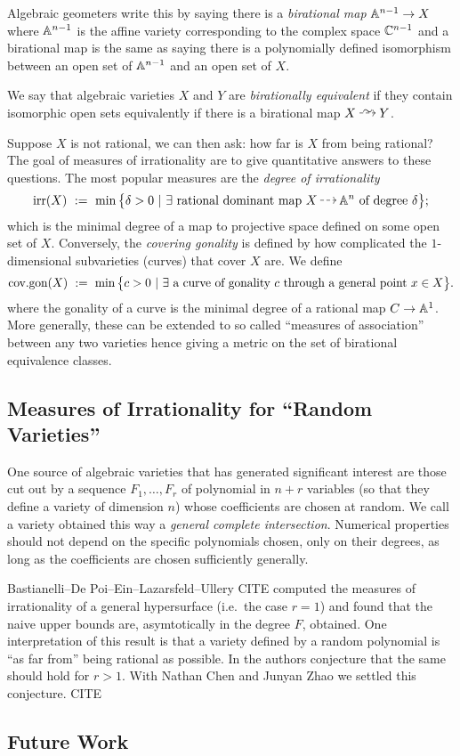 \documentclass[12pt]{article}
\begin{document}
Algebraic geometers write this by saying there is a \textit{birational map} $\mathbb{A}^{n-1} \to X$ where $\mathbb{A}^{n-1}$ is the affine variety corresponding to the complex space $\mathbb{C}^{n-1}$ and a birational map is the same as saying there is a polynomially defined isomorphism between an open set of $\mathbb{A}^{n-1}$ and an open set of $X$. 

\begin{defn}
We say that algebraic varieties $X$ and $Y$ are \textit{birationally equivalent} if they contain isomorphic open sets equivalently if there is a birational map $X \birat Y$.
\end{defn}

\newcommand{\irr}{\mathrm{irr}}
\newcommand{\covgon}{\mathrm{cov.gon}}

Suppose $X$ is not rational, we can then ask: how far is $X$ from being rational? The goal of measures of irrationality are to give quantitative answers to these questions. The most popular measures are the \textit{degree of irrationality}
\[ \irr(X)\ :=\ \min\big\{\delta>0\ |\ \exists\textup{ rational dominant map } X \rat \A^n\textup{ of degree }\delta\big\}; \]
which is the minimal degree of a map to projective space defined on some open set of $X$. Conversely, the \textit{covering gonality} is defined by how complicated the $1$-dimensional subvarieties (curves) that cover $X$ are. We define
\[ \covgon(X)\ :=\ \min\big\{c>0\ |\ \exists\textup{ a curve of gonality } c \textup{ through a general point } x\in X\big\}.\]
where the gonality of a curve is the minimal degree of a rational map $C \to \mathbb{A}^1$. More generally, these can be extended to so called ``measures of association'' between any two varieties hence giving a metric on the set of birational equivalence classes. 

\subsection{Measures of Irrationality for ``Random Varieties''}

One source of algebraic varieties that has generated significant interest are those cut out by a sequence $F_1, \dots, F_r$ of polynomial in $n + r$ variables (so that they define a variety of dimension $n$) whose coefficients are chosen at random. We call a variety obtained this way a \textit{general complete intersection}. Numerical properties should not depend on the specific polynomials chosen, only on their degrees, as long as the coefficients are chosen sufficiently generally. 
\par 
Bastianelli--De Poi--Ein--Lazarsfeld--Ullery {\color{red} CITE} computed the measures of irrationality of a general hypersurface (i.e.\ the case $r = 1$) and found that the naive upper bounds are, asymtotically in the degree $F$, obtained. One interpretation of this result is that a variety defined by a random polynomial 
is ``as far from'' being rational as possible. In \cite{BDELU} the authors conjecture that the same should hold for $r > 1$. With Nathan Chen and Junyan Zhao we settled this conjecture. 
 {\color{red} CITE} 

\subsection{Future Work}
\end{document}
